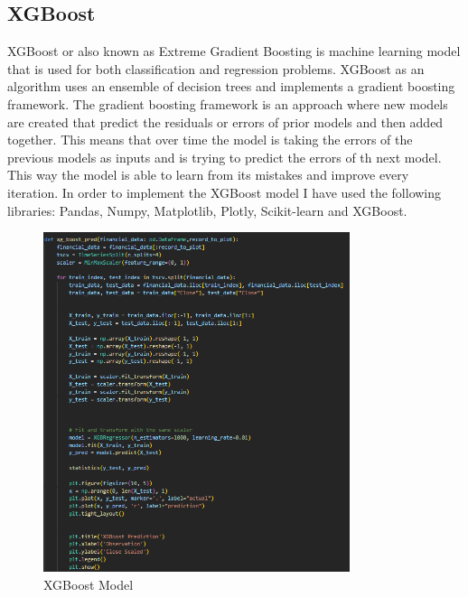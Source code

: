 \documentclass{imc-inf}
\begin{document}
	\subsection{XGBoost}
	XGBoost or also known as Extreme Gradient Boosting is machine learning model that is used for both classification and regression problems. XGBoost as an algorithm uses an ensemble of decision trees
	and implements a gradient boosting framework. The gradient boosting framework is an approach where new models are created that predict the residuals or errors of prior models and then added together.
	This means that over time the model is taking the errors of the previous models as inputs and is trying to predict the errors of th next model. This way the model is able to learn from its mistakes and improve every
	iteration. In order to implement the XGBoost model \cite{xgboost_implement} I have used the following libraries: Pandas, Numpy, Matplotlib, Plotly, Scikit-learn and XGBoost. 
	\begin{figure}[h]
		\centering
		\includegraphics[width=0.8\textwidth]{xgboost_code.png}
		\caption{XGBoost Model}
		\label{fig:xgboost_model}
	\end{figure}
	
\end{document}
